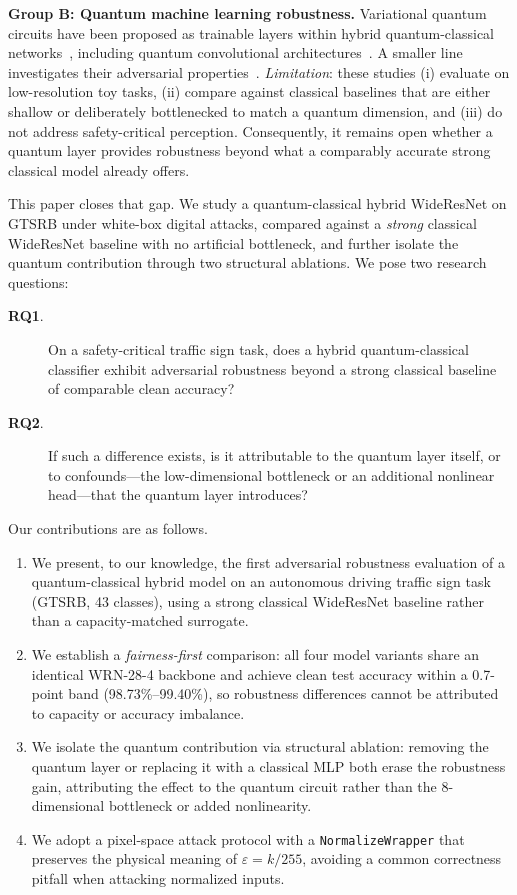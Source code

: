\documentclass[11pt]{article}
\newcommand{\eps}{\varepsilon}
\begin{document}
\textbf{Group B: Quantum machine learning robustness.}
Variational quantum circuits have been proposed as trainable layers within
hybrid quantum-classical networks~\cite{farhi2018quantum,schuld2014quantum,benedetti2019hybrid},
including quantum convolutional architectures~\cite{cong2019qcnn,herrera2019qcnn_vision}.
A smaller line investigates their adversarial
properties~\cite{lu2020quantum_adv,weber2020robust,preset2022qmlrobust}.
\emph{Limitation}: these studies (i) evaluate on low-resolution toy tasks,
(ii) compare against classical baselines that are either shallow or
deliberately bottlenecked to match a quantum dimension, and (iii) do not
address safety-critical perception. Consequently, it remains open whether
a quantum layer provides robustness beyond what a comparably accurate
strong classical model already offers.

This paper closes that gap. We study a quantum-classical hybrid WideResNet
on GTSRB under white-box digital attacks, compared against a \emph{strong}
classical WideResNet baseline with no artificial bottleneck, and further
isolate the quantum contribution through two structural ablations. We pose
two research questions:

\begin{description}
  \item[\textbf{RQ1}.] On a safety-critical traffic sign task, does a
    hybrid quantum-classical classifier exhibit adversarial robustness
    beyond a strong classical baseline of comparable clean accuracy?
  \item[\textbf{RQ2}.] If such a difference exists, is it attributable to the
    quantum layer itself, or to confounds---the low-dimensional bottleneck
    or an additional nonlinear head---that the quantum layer introduces?
\end{description}

Our contributions are as follows.
\begin{enumerate}
  \item We present, to our knowledge, the first adversarial robustness
    evaluation of a quantum-classical hybrid model on an autonomous driving
    traffic sign task (GTSRB, 43 classes), using a strong classical
    WideResNet baseline rather than a capacity-matched surrogate.
  \item We establish a \emph{fairness-first} comparison: all four model
    variants share an identical WRN-28-4 backbone and achieve clean test
    accuracy within a 0.7-point band (98.73\%--99.40\%), so robustness
    differences cannot be attributed to capacity or accuracy imbalance.
  \item We isolate the quantum contribution via structural ablation:
    removing the quantum layer or replacing it with a classical MLP both
    erase the robustness gain, attributing the effect to the quantum
    circuit rather than the 8-dimensional bottleneck or added nonlinearity.
  \item We adopt a pixel-space attack protocol with a
    \texttt{NormalizeWrapper} that preserves the physical meaning of
    $\eps = k/255$, avoiding a common correctness pitfall when attacking
    normalized inputs.
\end{enumerate}
\end{document}
